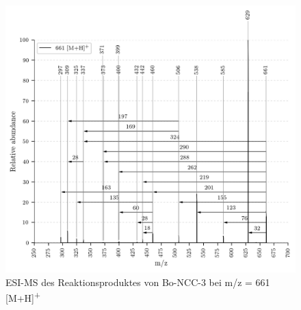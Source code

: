 \begin{figure}[!htbp]
  \centering
  \includegraphics[width=\textwidth, height=0.7\textwidth]{figures/Kapitel7/Kataboliten/VWA_MS_661.png}
  \caption[ESI-MS des Reaktionsproduktes von Bo-NCC-3, Quelle: Author]{ESI-MS des Reaktionsproduktes von Bo-NCC-3 bei m/z = 661 [M+H]\textsuperscript{+}}
  \label{fig:661MH}
\end{figure}

